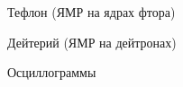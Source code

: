 \documentclass[a4paper,12pt]{article} %
\begin{document}
\begin{figure}[h!]
\begin{minipage}[h!]{0.45\linewidth}
 Тефлон (ЯМР на ядрах фтора) \\
\end{minipage}
\hfill
\begin{minipage}[h!]{0.45\linewidth}
 Дейтерий (ЯМР на дейтронах) \\
\end{minipage}
\caption{Осциллограммы}
\label{graphs}
\end{figure}
\end{document}
